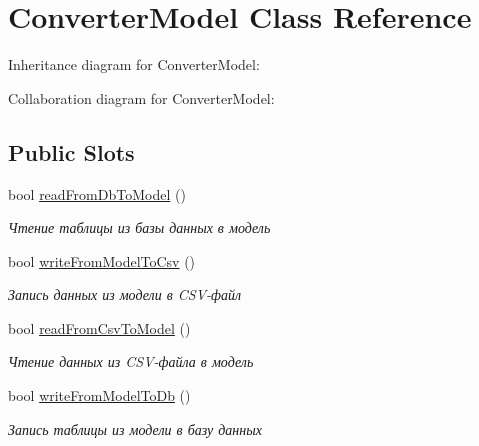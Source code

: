 \hypertarget{classConverterModel}{}\section{Converter\+Model Class Reference}
\label{classConverterModel}


Inheritance diagram for Converter\+Model\+:


Collaboration diagram for Converter\+Model\+:
\subsection*{Public Slots}
\begin{DoxyCompactItemize}
\item 
bool \hyperlink{classConverterModel_adae17a2e7799838bd628fac1b4f4b287}{read\+From\+Db\+To\+Model} ()
\begin{DoxyCompactList}\small\item\em Чтение таблицы из базы данных в модель \end{DoxyCompactList}\item 
bool \hyperlink{classConverterModel_a3fee672474b8e81f16f9b368c84fc10a}{write\+From\+Model\+To\+Csv} ()
\begin{DoxyCompactList}\small\item\em Запись данных из модели в C\+S\+V-\/файл \end{DoxyCompactList}\item 
bool \hyperlink{classConverterModel_ae872c32e1f477e31c484ecb9a85cafbb}{read\+From\+Csv\+To\+Model} ()
\begin{DoxyCompactList}\small\item\em Чтение данных из C\+S\+V-\/файла в модель \end{DoxyCompactList}\item 
bool \hyperlink{classConverterModel_a7bc6ea1e321ad26171f24874e5e42717}{write\+From\+Model\+To\+Db} ()
\begin{DoxyCompactList}\small\item\em Запись таблицы из модели в базу данных \end{DoxyCompactList}\end{DoxyCompactItemize}

